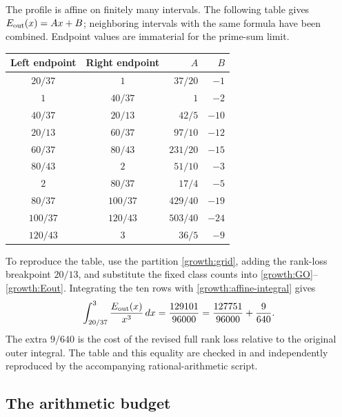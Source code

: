 The profile is affine on finitely many intervals. The following table
gives \(E_{\rm out}(x)=Ax+B\); neighboring intervals with the same
formula have been combined. Endpoint values are immaterial for the
prime-sum limit.
\begin{center}
\begin{tabular}{c c r r}
\hline
Left endpoint&Right endpoint&\(A\)&\(B\)\\ \hline
\(20/37\)&\(1\)&\(37/20\)&\(-1\)\\
\(1\)&\(40/37\)&\(1\)&\(-2\)\\
\(40/37\)&\(20/13\)&\(42/5\)&\(-10\)\\
\(20/13\)&\(60/37\)&\(97/10\)&\(-12\)\\
\(60/37\)&\(80/43\)&\(231/20\)&\(-15\)\\
\(80/43\)&\(2\)&\(51/10\)&\(-3\)\\
\(2\)&\(80/37\)&\(17/4\)&\(-5\)\\
\(80/37\)&\(100/37\)&\(429/40\)&\(-19\)\\
\(100/37\)&\(120/43\)&\(503/40\)&\(-24\)\\
\(120/43\)&\(3\)&\(36/5\)&\(-9\)\\ \hline
\end{tabular}
\end{center}
To reproduce the table, use the partition \eqref{growth:grid}, adding
the rank-loss breakpoint \(20/13\), and substitute the fixed class
counts into \eqref{growth:GO}--\eqref{growth:Eout}.
Integrating the ten rows with \eqref{growth:affine-integral} gives
\begin{equation}\label{growth:outer-integral}
 \int_{20/37}^{3}\frac{E_{\rm out}(x)}{x^3}\,dx
 =\frac{129101}{96000}
 =\frac{127751}{96000}+\frac9{640}.
\end{equation}
The extra \(9/640\) is the cost of the revised full rank loss relative
to the original outer integral. The table and this equality are checked
in \cite[\texttt{Growth/OuterTable.lean},
\texttt{TableIntegrals.lean}]{firsching} and independently reproduced
by the accompanying rational-arithmetic script.

\subsection{The arithmetic budget}

